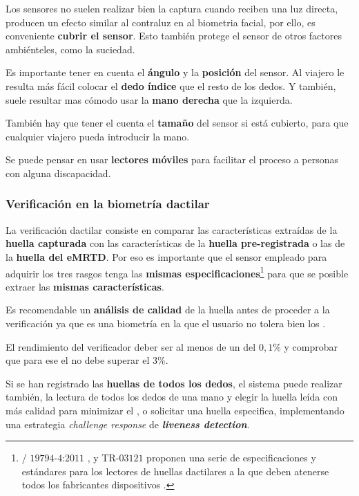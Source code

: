 Los sensores no suelen realizar bien la captura cuando reciben una luz directa, producen un efecto similar al contraluz en al \gls{biometria} \gls{facial}, por ello, es conveniente \textbf{cubrir el sensor}. Esto también protege el sensor de otros factores ambiénteles, como la suciedad. 

Es importante tener en cuenta el \textbf{ángulo} y la \textbf{posición} del sensor. Al viajero le resulta más fácil colocar el \textbf{dedo índice} que el resto de los dedos. Y también, suele resultar mas cómodo usar la \textbf{mano derecha} que la izquierda.

También hay que tener el cuenta el \textbf{tamaño} del sensor si está cubierto, para que cualquier viajero pueda introducir la mano. 

Se puede pensar en usar \textbf{lectores móviles} para facilitar el proceso a personas con alguna discapacidad.


\subsubsection{Verificación en la biometría dactilar}\label{subsec:VerificacionDactilarABC}

La verificación \gls{dactilar} consiste en comparar las características extraídas de la \textbf{huella capturada} con las características de la \textbf{huella pre-registrada} o las de la \textbf{huella del \gls{eMRTD}}. Por eso es importante que el sensor empleado para adquirir los tres rasgos tenga las \textbf{mismas especificaciones}\footnote{/ $19794$-$4$:$2011$ \cite{ISO/Finger},  \cite{FBIBioOnline} y  TR-$03121$ \cite{BSI-TR-03121} proponen una serie de especificaciones y estándares para los lectores de huellas dactilares a la que deben atenerse todos los fabricantes dispositivos .} para que se posible extraer las \textbf{mismas características}.

Es recomendable un \textbf{análisis de calidad} de la huella antes de proceder a la verificación ya que es una biometría en la que el usuario no tolera bien los . 

El rendimiento del verificador deber ser al menos de un \textbf{} del $0,1$\% y comprobar que para ese  el \textbf{} no debe superar el $3$\%. 

Si se han registrado las \textbf{huellas de todos los dedos}, el sistema puede realizar también, la lectura de todos los dedos de una mano y elegir la huella leída con más calidad para minimizar el , o solicitar una huella especifica, implementando una estrategia \textit{\gls{challenge response}} de \textbf{\textit{\gls{liveness detection}}}.   


